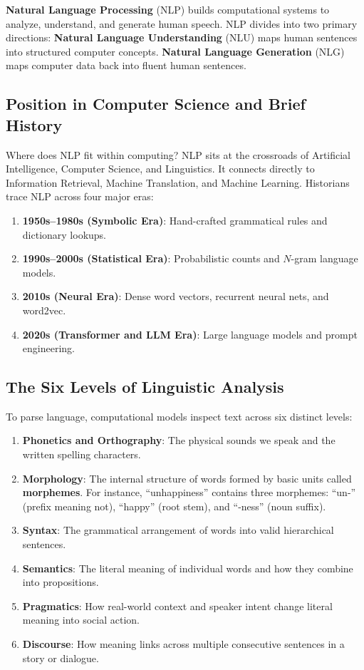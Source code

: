 \documentclass[a4paper,11pt]{article}
\newcommand{\vocab}[1]{\textbf{#1}}
\begin{document}
\begin{intuition}
\vocab{Natural Language Processing} (NLP) builds computational systems to analyze, understand, and generate human speech.
NLP divides into two primary directions:
\vocab{Natural Language Understanding} (NLU) maps human sentences into structured computer concepts.
\vocab{Natural Language Generation} (NLG) maps computer data back into fluent human sentences.
\end{intuition}

\subsection{Position in Computer Science and Brief History}
Where does NLP fit within computing?
NLP sits at the crossroads of Artificial Intelligence, Computer Science, and Linguistics.
It connects directly to Information Retrieval, Machine Translation, and Machine Learning.
Historians trace NLP across four major eras:
\begin{enumerate}
  \item \textbf{1950s--1980s (Symbolic Era)}: Hand-crafted grammatical rules and dictionary lookups.
  \item \textbf{1990s--2000s (Statistical Era)}: Probabilistic counts and $N$-gram language models.
  \item \textbf{2010s (Neural Era)}: Dense word vectors, recurrent neural nets, and word2vec.
  \item \textbf{2020s (Transformer and LLM Era)}: Large language models and prompt engineering.
\end{enumerate}

\subsection{The Six Levels of Linguistic Analysis}
To parse language, computational models inspect text across six distinct levels:
\begin{enumerate}
  \item \vocab{Phonetics and Orthography}: The physical sounds we speak and the written spelling characters.
  \item \vocab{Morphology}: The internal structure of words formed by basic units called \vocab{morphemes}.
        For instance, ``unhappiness'' contains three morphemes: ``un-'' (prefix meaning not), ``happy'' (root stem), and ``-ness'' (noun suffix).
  \item \vocab{Syntax}: The grammatical arrangement of words into valid hierarchical sentences.
  \item \vocab{Semantics}: The literal meaning of individual words and how they combine into propositions.
  \item \vocab{Pragmatics}: How real-world context and speaker intent change literal meaning into social action.
  \item \vocab{Discourse}: How meaning links across multiple consecutive sentences in a story or dialogue.
\end{enumerate}
\end{document}
